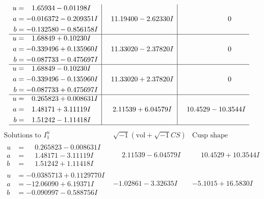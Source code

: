 \documentclass[1p]{elsarticle_modified}
\theoremstyle{definition}
\newcommand{\I}{\sqrt{-1}}
\begin{document}
$$\begin{array}{c|c|c}
\begin{aligned}
u &= \phantom{-}1.65934 - 0.01198 I \\
a &= -0.016372 - 0.209351 I \\
b &= -0.132580 - 0.856158 I\end{aligned}
 & \phantom{-}11.19400 - 2.62330 I & \phantom{-0.000000 } 0 \\ \hline\begin{aligned}
u &= \phantom{-}1.68849 + 0.10230 I \\
a &= -0.339496 + 0.135960 I \\
b &= -0.087733 - 0.475697 I\end{aligned}
 & \phantom{-}11.33020 - 2.37820 I & \phantom{-0.000000 } 0 \\ \hline\begin{aligned}
u &= \phantom{-}1.68849 - 0.10230 I \\
a &= -0.339496 - 0.135960 I \\
b &= -0.087733 + 0.475697 I\end{aligned}
 & \phantom{-}11.33020 + 2.37820 I & \phantom{-0.000000 } 0 \\ \hline\begin{aligned}
u &= \phantom{-}0.265823 + 0.008631 I \\
a &= \phantom{-}1.48171 + 3.11119 I \\
b &= \phantom{-}1.51242 - 1.11418 I\end{aligned}
 & \phantom{-}2.11539 + 6.04579 I & \phantom{-}10.4529 - 10.3544 I\\
 \hline 
 \end{array}$$\newpage$$\begin{array}{c|c|c}  
\text{Solutions to }I^u_{1}& \I (\text{vol} + \sqrt{-1}CS) & \text{Cusp shape}\\
 \hline 
\begin{aligned}
u &= \phantom{-}0.265823 - 0.008631 I \\
a &= \phantom{-}1.48171 - 3.11119 I \\
b &= \phantom{-}1.51242 + 1.11418 I\end{aligned}
 & \phantom{-}2.11539 - 6.04579 I & \phantom{-}10.4529 + 10.3544 I \\ \hline\begin{aligned}
u &= -0.0385713 + 0.1129770 I \\
a &= -12.06090 + 6.19371 I \\
b &= -0.090997 - 0.588756 I\end{aligned}
 & -1.02861 - 3.32635 I & -5.1015 + 16.5830 I \\ \hline\begin{aligned}

\end{aligned}
\end{array}$$
\end{document}
